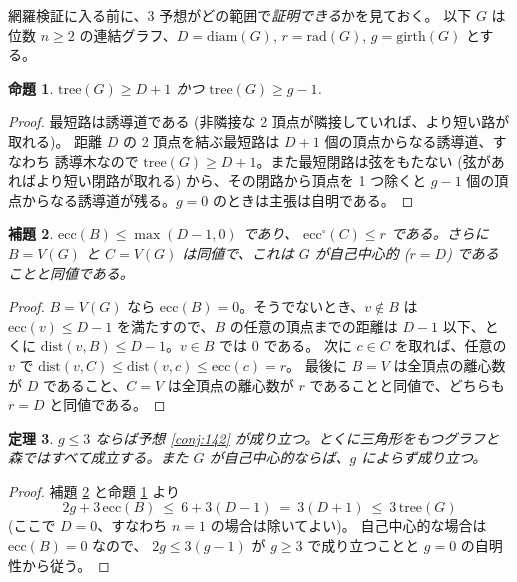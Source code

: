 \documentclass[paper=a4,fontsize=10.5pt,jafontsize=10.5pt]{jlreq}
\theoremstyle{plain}
\newtheorem{theorem}{定理}[section]
\newtheorem{proposition}[theorem]{命題}
\newtheorem{lemma}[theorem]{補題}
\theoremstyle{definition}
\begin{document}
網羅検証に入る前に、3 予想がどの範囲で\emph{証明できる}かを見ておく。
以下 $G$ は位数 $n \ge 2$ の連結グラフ、$D = \mathrm{diam}(G)$,
$r = \mathrm{rad}(G)$, $g = \mathrm{girth}(G)$ とする。

\begin{proposition}\label{prop:lower}
$\mathrm{tree}(G) \ge D + 1$ かつ $\mathrm{tree}(G) \ge g - 1$.
\end{proposition}

\begin{proof}
最短路は誘導道である (非隣接な 2 頂点が隣接していれば、より短い路が取れる)。
距離 $D$ の 2 頂点を結ぶ最短路は $D+1$ 個の頂点からなる誘導道、すなわち
誘導木なので $\mathrm{tree}(G) \ge D+1$。また最短閉路は弦をもたない
(弦があればより短い閉路が取れる) から、その閉路から頂点を 1 つ除くと
$g-1$ 個の頂点からなる誘導道が残る。$g = 0$ のときは主張は自明である。
\end{proof}

\begin{lemma}\label{lem:ecc}
$\mathrm{ecc}(B) \le \max(D - 1, 0)$ であり、
$\mathrm{ecc}^{\circ}(C) \le r$ である。さらに $B = V(G)$ と
$C = V(G)$ は同値で、これは $G$ が自己中心的 ($r = D$) であることと同値である。
\end{lemma}

\begin{proof}
$B = V(G)$ なら $\mathrm{ecc}(B) = 0$。そうでないとき、$v \notin B$ は
$\mathrm{ecc}(v) \le D - 1$ を満たすので、$B$ の任意の頂点までの距離は
$D-1$ 以下、とくに $\mathrm{dist}(v, B) \le D-1$。$v \in B$ では $0$ である。
次に $c \in C$ を取れば、任意の $v$ で
$\mathrm{dist}(v, C) \le \mathrm{dist}(v, c) \le \mathrm{ecc}(c) = r$。
最後に $B = V$ は全頂点の離心数が $D$ であること、$C = V$ は全頂点の離心数が
$r$ であることと同値で、どちらも $r = D$ と同値である。
\end{proof}

\begin{theorem}\label{thm:142g3}
$g \le 3$ ならば予想 \ref{conj:142} が成り立つ。とくに三角形をもつグラフと
森ではすべて成立する。また $G$ が自己中心的ならば、$g$ によらず成り立つ。
\end{theorem}

\begin{proof}
補題 \ref{lem:ecc} と命題 \ref{prop:lower} より
\[ 2g + 3\,\mathrm{ecc}(B) \ \le \ 6 + 3(D-1) \ = \ 3(D+1)
   \ \le \ 3\,\mathrm{tree}(G) \]
(ここで $D = 0$、すなわち $n = 1$ の場合は除いてよい)。
自己中心的な場合は $\mathrm{ecc}(B) = 0$ なので、
$2g \le 3(g-1)$ が $g \ge 3$ で成り立つことと $g = 0$ の自明性から従う。
\end{proof}
\end{document}
